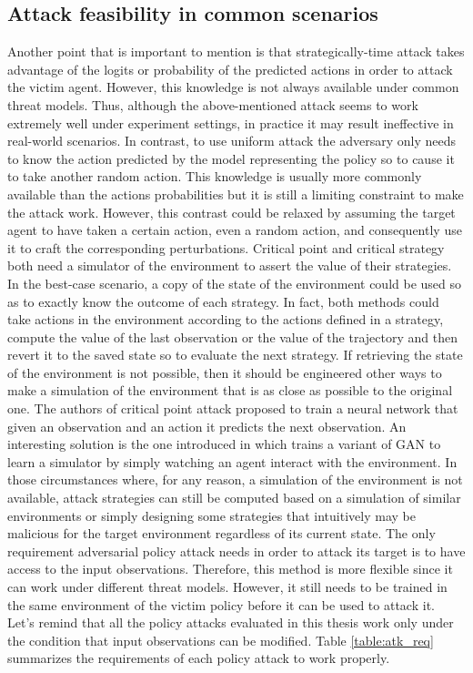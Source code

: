 \subsection{Attack feasibility in common scenarios}
Another point that is important to mention is that strategically-time attack takes advantage of the logits or probability of the predicted actions in order to attack the victim agent. However, this knowledge is not always available under common threat models. Thus, although the above-mentioned attack seems to work extremely well under experiment settings, in practice it may result ineffective in real-world scenarios. In contrast, to use uniform attack the adversary only needs to know the action predicted by the model representing the policy so to cause it to take another random action. This knowledge is usually more commonly available than the actions probabilities but it is still a limiting constraint to make the attack work. However, this contrast could be relaxed by assuming the target agent to have taken a certain action, even a random action, and consequently use it to craft the corresponding perturbations. Critical point and critical strategy both need a simulator of the environment to assert the value of their strategies. In the best-case scenario, a copy of the state of the environment could be used so as to exactly know the outcome of each strategy. In fact, both methods could take actions in the environment according to the actions defined in a strategy, compute the value of the last observation or the value of the trajectory and then revert it to the saved state so to evaluate the next strategy. If retrieving the state of the environment is not possible, then it should be engineered other ways to make a simulation of the environment that is as close as possible to the original one. The authors of critical point attack proposed to train a neural network that given an observation and an action it predicts the next observation. An interesting solution is the one introduced in \cite{kim2020learning} which trains a variant of GAN to learn a simulator by simply watching an agent interact with the environment. In those circumstances where, for any reason, a simulation of the environment is not available, attack strategies can still be computed based on a simulation of similar environments or simply designing some strategies that intuitively may be malicious for the target environment regardless of its current state. The only requirement adversarial policy attack needs in order to attack its target is to have access to the input observations. Therefore, this method is more flexible since it can work under different threat models. However, it still needs to be trained in the same environment of the victim policy before it can be used to attack it. Let's remind that all the policy attacks evaluated in this thesis work only under the condition that input observations can be modified. Table \ref{table:atk_req} summarizes the requirements of each policy attack to work properly.

